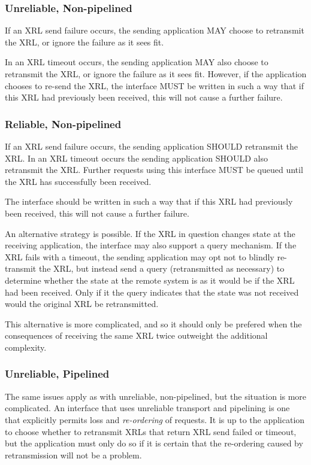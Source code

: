 \documentclass[11pt]{article}
\begin{document}
\subsubsection*{Unreliable, Non-pipelined}

If an XRL send failure occurs, the sending application MAY choose to
retransmit the XRL, or ignore the failure as it sees fit.  

In an XRL timeout occurs, the sending application MAY also choose to
retransmit the XRL, or ignore the failure as it sees fit.  However, if
the application chooses to re-send the XRL, the interface MUST be
written in such a way that if this XRL had previously been received,
this will not cause a further failure.

\subsubsection*{Reliable, Non-pipelined}

If an XRL send failure occurs, the sending application SHOULD
retransmit the XRL.  In an XRL timeout occurs the sending application
SHOULD also retransmit the XRL.  Further requests using this interface
MUST be queued until the XRL has successfully been received.

The interface should be written in such a way that if this XRL had
previously been received, this will not cause a further failure.

An alternative strategy is possible.  If the XRL in question changes
state at the receiving application, the interface may also support a
query mechanism.  If the XRL fails with a timeout, the sending
application may opt not to blindly re-transmit the XRL, but instead
send a query (retransmitted as necessary) to determine whether the
state at the remote system is as it would be if the XRL had been
received.  Only if it the query indicates that the state was not
received would the original XRL be retransmitted.

This alternative is more complicated, and so it should only be
prefered when the consequences of receiving the same XRL twice
outweight the additional complexity.

\subsubsection*{Unreliable, Pipelined}

The same issues apply as with unreliable, non-pipelined, but the
situation is more complicated.  An interface that uses unreliable
transport and pipelining is one that explicitly permits loss and {\em
re-ordering} of requests.  It is up to the application to choose
whether to retransmit XRLs that return XRL send failed or timeout, but
the application must only do so if it is certain that the re-ordering
caused by retransmission will not be a problem.
\end{document}
